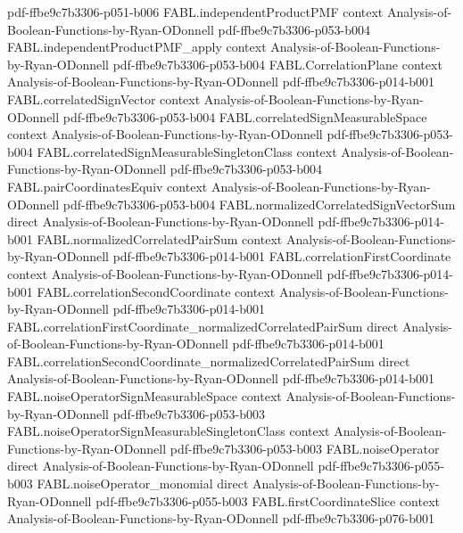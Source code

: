 \begin{theorem}
  {pdf-ffbe9c7b3306-p051-b006}
\proofstep
  {FABL.independentProductPMF}
  {context}
  {Analysis-of-Boolean-Functions-by-Ryan-ODonnell}
  {pdf-ffbe9c7b3306-p053-b004}
\proofstep
  {FABL.independentProductPMF_apply}
  {context}
  {Analysis-of-Boolean-Functions-by-Ryan-ODonnell}
  {pdf-ffbe9c7b3306-p053-b004}
\proofstep
  {FABL.CorrelationPlane}
  {context}
  {Analysis-of-Boolean-Functions-by-Ryan-ODonnell}
  {pdf-ffbe9c7b3306-p014-b001}
\proofstep
  {FABL.correlatedSignVector}
  {context}
  {Analysis-of-Boolean-Functions-by-Ryan-ODonnell}
  {pdf-ffbe9c7b3306-p053-b004}
\proofstep
  {FABL.correlatedSignMeasurableSpace}
  {context}
  {Analysis-of-Boolean-Functions-by-Ryan-ODonnell}
  {pdf-ffbe9c7b3306-p053-b004}
\proofstep
  {FABL.correlatedSignMeasurableSingletonClass}
  {context}
  {Analysis-of-Boolean-Functions-by-Ryan-ODonnell}
  {pdf-ffbe9c7b3306-p053-b004}
\proofstep
  {FABL.pairCoordinatesEquiv}
  {context}
  {Analysis-of-Boolean-Functions-by-Ryan-ODonnell}
  {pdf-ffbe9c7b3306-p053-b004}
\proofstep
  {FABL.normalizedCorrelatedSignVectorSum}
  {direct}
  {Analysis-of-Boolean-Functions-by-Ryan-ODonnell}
  {pdf-ffbe9c7b3306-p014-b001}
\proofstep
  {FABL.normalizedCorrelatedPairSum}
  {context}
  {Analysis-of-Boolean-Functions-by-Ryan-ODonnell}
  {pdf-ffbe9c7b3306-p014-b001}
\proofstep
  {FABL.correlationFirstCoordinate}
  {context}
  {Analysis-of-Boolean-Functions-by-Ryan-ODonnell}
  {pdf-ffbe9c7b3306-p014-b001}
\proofstep
  {FABL.correlationSecondCoordinate}
  {context}
  {Analysis-of-Boolean-Functions-by-Ryan-ODonnell}
  {pdf-ffbe9c7b3306-p014-b001}
\proofstep
  {FABL.correlationFirstCoordinate_normalizedCorrelatedPairSum}
  {direct}
  {Analysis-of-Boolean-Functions-by-Ryan-ODonnell}
  {pdf-ffbe9c7b3306-p014-b001}
\proofstep
  {FABL.correlationSecondCoordinate_normalizedCorrelatedPairSum}
  {direct}
  {Analysis-of-Boolean-Functions-by-Ryan-ODonnell}
  {pdf-ffbe9c7b3306-p014-b001}
\proofstep
  {FABL.noiseOperatorSignMeasurableSpace}
  {context}
  {Analysis-of-Boolean-Functions-by-Ryan-ODonnell}
  {pdf-ffbe9c7b3306-p053-b003}
\proofstep
  {FABL.noiseOperatorSignMeasurableSingletonClass}
  {context}
  {Analysis-of-Boolean-Functions-by-Ryan-ODonnell}
  {pdf-ffbe9c7b3306-p053-b003}
\proofstep
  {FABL.noiseOperator}
  {direct}
  {Analysis-of-Boolean-Functions-by-Ryan-ODonnell}
  {pdf-ffbe9c7b3306-p055-b003}
\proofstep
  {FABL.noiseOperator_monomial}
  {direct}
  {Analysis-of-Boolean-Functions-by-Ryan-ODonnell}
  {pdf-ffbe9c7b3306-p055-b003}
\proofstep
  {FABL.firstCoordinateSlice}
  {context}
  {Analysis-of-Boolean-Functions-by-Ryan-ODonnell}
  {pdf-ffbe9c7b3306-p076-b001}

\end{theorem}
